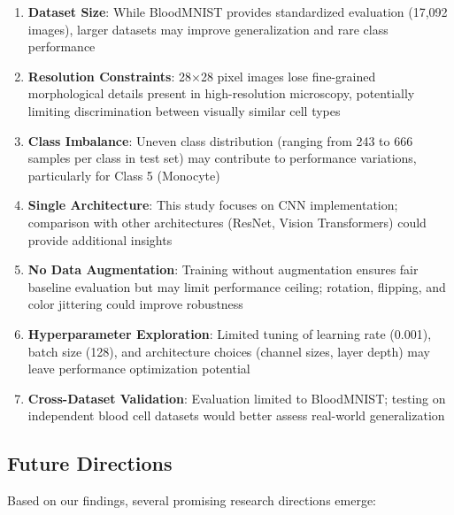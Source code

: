 \documentclass[runningheads]{llncs}
\begin{document}
\begin{enumerate}
    \item \textbf{Dataset Size}: While BloodMNIST provides standardized evaluation (17,092 images), larger datasets may improve generalization and rare class performance
    
    \item \textbf{Resolution Constraints}: 28×28 pixel images lose fine-grained morphological details present in high-resolution microscopy, potentially limiting discrimination between visually similar cell types
    
    \item \textbf{Class Imbalance}: Uneven class distribution (ranging from 243 to 666 samples per class in test set) may contribute to performance variations, particularly for Class 5 (Monocyte)
    
    \item \textbf{Single Architecture}: This study focuses on CNN implementation; comparison with other architectures (ResNet, Vision Transformers) could provide additional insights
    
    \item \textbf{No Data Augmentation}: Training without augmentation ensures fair baseline evaluation but may limit performance ceiling; rotation, flipping, and color jittering could improve robustness
    
    \item \textbf{Hyperparameter Exploration}: Limited tuning of learning rate (0.001), batch size (128), and architecture choices (channel sizes, layer depth) may leave performance optimization potential
    
    \item \textbf{Cross-Dataset Validation}: Evaluation limited to BloodMNIST; testing on independent blood cell datasets would better assess real-world generalization
\end{enumerate}

\subsection{Future Directions}

Based on our findings, several promising research directions emerge:
\end{document}
